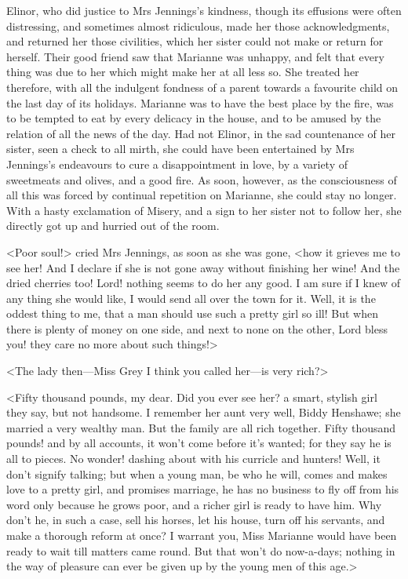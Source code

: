 Elinor, who did justice to Mrs Jennings's kindness, though its effusions were often distressing, and sometimes almost ridiculous, made her those acknowledgments, and returned her those civilities, which her sister could not make or return for herself. Their good friend saw that Marianne was unhappy, and felt that every thing was due to her which might make her at all less so. She treated her therefore, with all the indulgent fondness of a parent towards a favourite child on the last day of its holidays. Marianne was to have the best place by the fire, was to be tempted to eat by every delicacy in the house, and to be amused by the relation of all the news of the day. Had not Elinor, in the sad countenance of her sister, seen a check to all mirth, she could have been entertained by Mrs Jennings's endeavours to cure a disappointment in love, by a variety of sweetmeats and olives, and a good fire. As soon, however, as the consciousness of all this was forced by continual repetition on Marianne, she could stay no longer. With a hasty exclamation of Misery, and a sign to her sister not to follow her, she directly got up and hurried out of the room.

<Poor soul!> cried Mrs Jennings, as soon as she was gone, <how it grieves me to see her! And I declare if she is not gone away without finishing her wine! And the dried cherries too! Lord! nothing seems to do her any good. I am sure if I knew of any thing she would like, I would send all over the town for it. Well, it is the oddest thing to me, that a man should use such a pretty girl so ill! But when there is plenty of money on one side, and next to none on the other, Lord bless you! they care no more about such things!\longdash>

<The lady then—Miss Grey I think you called her—is very rich?>

<Fifty thousand pounds, my dear. Did you ever see her? a smart, stylish girl they say, but not handsome. I remember her aunt very well, Biddy Henshawe; she married a very wealthy man. But the family are all rich together. Fifty thousand pounds! and by all accounts, it won't come before it's wanted; for they say he is all to pieces. No wonder! dashing about with his curricle and hunters! Well, it don't signify talking; but when a young man, be who he will, comes and makes love to a pretty girl, and promises marriage, he has no business to fly off from his word only because he grows poor, and a richer girl is ready to have him. Why don't he, in such a case, sell his horses, let his house, turn off his servants, and make a thorough reform at once? I warrant you, Miss Marianne would have been ready to wait till matters came round. But that won't do now-a-days; nothing in the way of pleasure can ever be given up by the young men of this age.>

